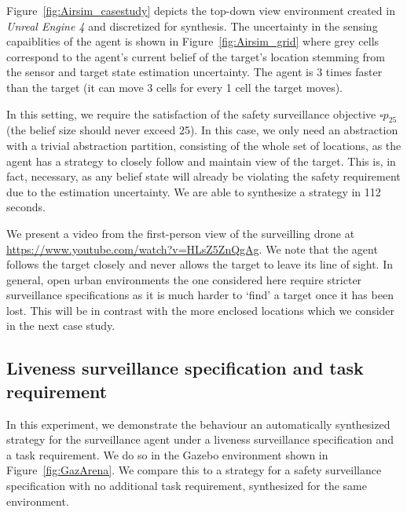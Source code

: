 Figure~\ref{fig:Airsim_casestudy} depicts the top-down view environment created in \emph{Unreal Engine 4} and discretized for synthesis. The uncertainty in the sensing capaiblities of the agent is shown in Figure~\ref{fig:Airsim_grid} where grey cells correspond to the agent's current belief of the target's location stemming from the sensor and target state estimation uncertainty. The agent is 3 times faster than the target (it can move 3 cells for every 1 cell the target moves). 

In this setting, we require the satisfaction of the safety surveillance objective $\square p_{25}$ (the belief size should never exceed 25). In this case, we only need an abstraction with a trivial abstraction partition, consisting of the whole set of locations, as the agent has a strategy to closely follow and maintain view of the target. This is, in fact, necessary, as
any belief state will already be violating the safety requirement due to the estimation uncertainty. We are able to synthesize a strategy in 112 seconds. 
 
We present a video from the first-person view of the surveilling drone at \url{https://www.youtube.com/watch?v=HLsZ5ZnQgAg}. We note that the agent follows the target closely and never allows the target to leave its line of sight. In general, open urban environments the one considered here require stricter surveillance specifications as it is much harder to `find' a target once it has been lost. This will be in contrast with the more enclosed locations which we consider in the next case study.




\subsection{Liveness surveillance specification and task requirement} 
In this experiment, we demonstrate the behaviour an automatically synthesized strategy for the surveillance agent under a liveness surveillance specification and a task requirement. We do so in the Gazebo environment shown in Figure~\ref{fig:GazArena}. We compare this to a strategy for a safety surveillance specification with no additional task requirement, synthesized for the same environment. 



